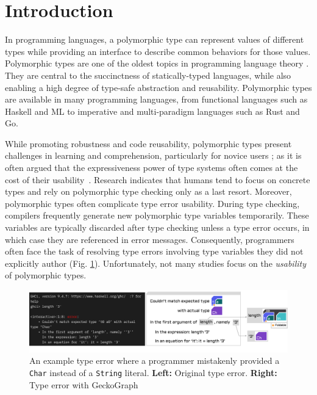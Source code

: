 \documentclass[preprint,12pt]{elsarticle}
\begin{document}
\section{Introduction} \label{sec:intro}
In programming languages, a polymorphic type \cite{Cardelli1987-fp} can represent values of different types while providing an interface to describe common behaviors for those values. Polymorphic types are one of the oldest topics in programming language theory \cite{Cardelli1987-fp}. They are central to the succinctness of statically-typed languages, while also enabling a high degree of type-safe abstraction and reusability. Polymorphic types are available in many programming languages, from functional languages such as Haskell and ML to imperative and multi-paradigm languages such as Rust\cite{Klabnik_undated-wx} and Go\cite{Griesemer_undated-ff}.


While promoting robustness and code reusability, polymorphic types present challenges in learning and comprehension, particularly for novice users \cite{Jun2000-ec, Jun2000-yu}; as it is often argued that the expressiveness power of type systems often comes at the cost of their usability~\cite{Hage2020-hg}. Research indicates that humans tend to focus on concrete types and rely on polymorphic type checking only as a last resort. Moreover, polymorphic types often complicate type error usability. During type checking, compilers frequently generate new polymorphic type variables temporarily. These variables are typically discarded after type checking unless a type error occurs, in which case they are referenced in error messages. Consequently, programmers often face the task of resolving type errors involving type variables they did not explicitly author (Fig. \ref{fig:example-foldable}). Unfortunately, not many studies focus on the \textit{usability} of polymorphic types. 

\begin{figure}[]
  \includegraphics[width=\linewidth]{figures/Foldable}
  \caption{\label{fig:example-foldable} An example type error where a programmer mistakenly provided a \texttt{Char} instead of a \texttt{String} literal. {\bf Left:} Original type error. {\bf Right:} Type error with GeckoGraph}
\end{figure}
\end{document}
